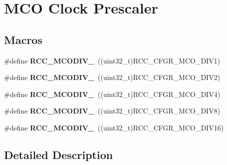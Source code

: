 \hypertarget{group___r_c_c___m_c_ox___clock___prescaler}{\section{M\-C\-O Clock Prescaler}
\label{group___r_c_c___m_c_ox___clock___prescaler}
}
\subsection*{Macros}
\begin{DoxyCompactItemize}
\item 
\hypertarget{group___r_c_c___m_c_ox___clock___prescaler_ga438d8c3bead4e1ec5dd5757cb0313d53}{\#define {\bfseries R\-C\-C\-\_\-\-M\-C\-O\-D\-I\-V\-\_}~((uint32\-\_\-t)R\-C\-C\-\_\-\-C\-F\-G\-R\-\_\-\-M\-C\-O\-\_\-\-D\-I\-V1)}\label{group___r_c_c___m_c_ox___clock___prescaler_ga438d8c3bead4e1ec5dd5757cb0313d53}

\item 
\hypertarget{group___r_c_c___m_c_ox___clock___prescaler_ga6198330847077f4da351915518140bfc}{\#define {\bfseries R\-C\-C\-\_\-\-M\-C\-O\-D\-I\-V\-\_}~((uint32\-\_\-t)R\-C\-C\-\_\-\-C\-F\-G\-R\-\_\-\-M\-C\-O\-\_\-\-D\-I\-V2)}\label{group___r_c_c___m_c_ox___clock___prescaler_ga6198330847077f4da351915518140bfc}

\item 
\hypertarget{group___r_c_c___m_c_ox___clock___prescaler_ga1bdc2eb56aaeb53dc3ca5cd72f22d4c8}{\#define {\bfseries R\-C\-C\-\_\-\-M\-C\-O\-D\-I\-V\-\_}~((uint32\-\_\-t)R\-C\-C\-\_\-\-C\-F\-G\-R\-\_\-\-M\-C\-O\-\_\-\-D\-I\-V4)}\label{group___r_c_c___m_c_ox___clock___prescaler_ga1bdc2eb56aaeb53dc3ca5cd72f22d4c8}

\item 
\hypertarget{group___r_c_c___m_c_ox___clock___prescaler_gadb84d9a10db2c49376be8fada619fe08}{\#define {\bfseries R\-C\-C\-\_\-\-M\-C\-O\-D\-I\-V\-\_}~((uint32\-\_\-t)R\-C\-C\-\_\-\-C\-F\-G\-R\-\_\-\-M\-C\-O\-\_\-\-D\-I\-V8)}\label{group___r_c_c___m_c_ox___clock___prescaler_gadb84d9a10db2c49376be8fada619fe08}

\item 
\hypertarget{group___r_c_c___m_c_ox___clock___prescaler_ga3ab3ab9547ef8800355111517b547882}{\#define {\bfseries R\-C\-C\-\_\-\-M\-C\-O\-D\-I\-V\-\_}~((uint32\-\_\-t)R\-C\-C\-\_\-\-C\-F\-G\-R\-\_\-\-M\-C\-O\-\_\-\-D\-I\-V16)}\label{group___r_c_c___m_c_ox___clock___prescaler_ga3ab3ab9547ef8800355111517b547882}

\end{DoxyCompactItemize}


\subsection{Detailed Description}
